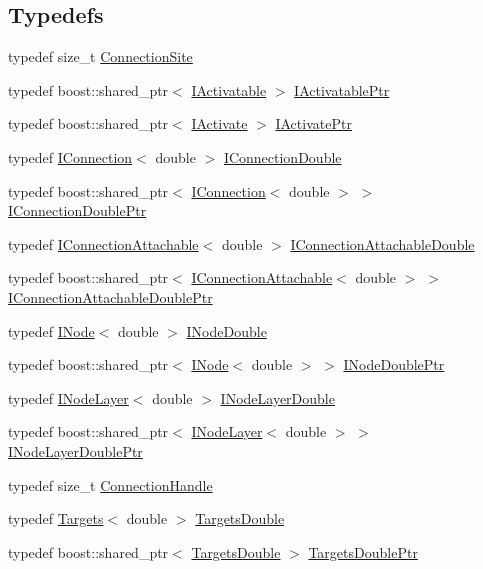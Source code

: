 \subsection*{Typedefs}
\begin{DoxyCompactItemize}
\item 
typedef size\_\-t \hyperlink{namespace_neural_add871cb0324e8abfb693026afba3a621}{ConnectionSite}
\item 
typedef boost::shared\_\-ptr$<$ \hyperlink{class_neural_1_1_i_activatable}{IActivatable} $>$ \hyperlink{namespace_neural_a2c97f9785f7a89940e070ce1eb702050}{IActivatablePtr}
\item 
typedef boost::shared\_\-ptr$<$ \hyperlink{class_neural_1_1_i_activate}{IActivate} $>$ \hyperlink{namespace_neural_aa317acf32f01510e99627087e14785c1}{IActivatePtr}
\item 
typedef \hyperlink{class_neural_1_1_i_connection}{IConnection}$<$ double $>$ \hyperlink{namespace_neural_a9fd82ddb78d2599e07b1b9767d2c05dd}{IConnectionDouble}
\item 
typedef boost::shared\_\-ptr$<$ \hyperlink{class_neural_1_1_i_connection}{IConnection}$<$ double $>$ $>$ \hyperlink{namespace_neural_a393cd7c1342291920cff93b61ed6a997}{IConnectionDoublePtr}
\item 
typedef \hyperlink{class_neural_1_1_i_connection_attachable}{IConnectionAttachable}$<$ double $>$ \hyperlink{namespace_neural_a1c06538a2d859c6085e54d09f3ffbfe7}{IConnectionAttachableDouble}
\item 
typedef boost::shared\_\-ptr$<$ \hyperlink{class_neural_1_1_i_connection_attachable}{IConnectionAttachable}$<$ double $>$ $>$ \hyperlink{namespace_neural_aa1aecf50940c2cf448c01da3a4260153}{IConnectionAttachableDoublePtr}
\item 
typedef \hyperlink{class_neural_1_1_i_node}{INode}$<$ double $>$ \hyperlink{namespace_neural_a9181caa1e6e1b8595dddf9078d06cc15}{INodeDouble}
\item 
typedef boost::shared\_\-ptr$<$ \hyperlink{class_neural_1_1_i_node}{INode}$<$ double $>$ $>$ \hyperlink{namespace_neural_afb5825612e72eb811b0268d6b3520db8}{INodeDoublePtr}
\item 
typedef \hyperlink{class_neural_1_1_i_node_layer}{INodeLayer}$<$ double $>$ \hyperlink{namespace_neural_a62a23712e05b6337f98971c88c2f269a}{INodeLayerDouble}
\item 
typedef boost::shared\_\-ptr$<$ \hyperlink{class_neural_1_1_i_node_layer}{INodeLayer}$<$ double $>$ $>$ \hyperlink{namespace_neural_a612647db5493ae91ae0bab82ae5a927b}{INodeLayerDoublePtr}
\item 
typedef size\_\-t \hyperlink{namespace_neural_a73b2763d14999ad4308dbf4246aa503f}{ConnectionHandle}
\item 
typedef \hyperlink{class_neural_1_1_targets}{Targets}$<$ double $>$ \hyperlink{namespace_neural_a9db3f6f54dd6f3a52968a6d77138ed04}{TargetsDouble}
\item 
typedef boost::shared\_\-ptr$<$ \hyperlink{class_neural_1_1_targets}{TargetsDouble} $>$ \hyperlink{namespace_neural_ae0980fb603c1578bd796144ae1f3c4f7}{TargetsDoublePtr}
\end{DoxyCompactItemize}
